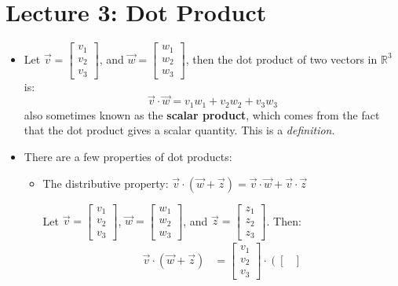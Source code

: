\section{Lecture 3: Dot Product}
\begin{itemize}
    \item Let $\vec{v}=\begin{bmatrix}
        v_1\\v_2\\v_3
    \end{bmatrix}$, and $\vec{w}=\begin{bmatrix}
        w_1\\w_2\\w_3
    \end{bmatrix}$, then the dot product of two vectors in $\mathbb{R}^3$ is:
    \begin{equation}
        \vec{v}\cdot\vec{w} = v_1w_1+v_2w_2+v_3w_3
        \label{eq:}
    \end{equation}
    also sometimes known as the \textbf{scalar product}, which comes from the fact that the dot product gives a scalar quantity. This is a \textit{definition}.
    \item There are a few properties of dot products:
    \begin{itemize}
        \item The distributive property: $\vec{v} \cdot (\vec{w}+\vec{z})=\vec{v}\cdot\vec{w}+\vec{v}\cdot\vec{z}$
        \begin{prooof}
            Let $\vec{v}=\begin{bmatrix}
                v_1\\v_2\\v_3
            \end{bmatrix}$, $\vec{w}=\begin{bmatrix}
                w_1\\w_2\\w_3
            \end{bmatrix}$, and $\vec{z}=\begin{bmatrix}
                z_1\\z_2\\z_3
            \end{bmatrix}$. Then:
            \begin{align}
                \vec{v}\cdot(\vec{w}+\vec{z}) &= \begin{bmatrix}
                    v_1\\v_2\\v_3
                \end{bmatrix} \cdot \left(\begin{bmatrix}

\end{bmatrix}
\end{align}
\end{prooof}
\end{itemize}
\end{itemize}
